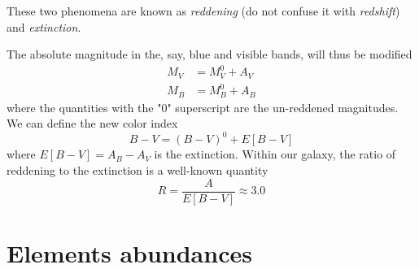 \par These two phenomena are known as \emph{reddening} (do not confuse it with \emph{redshift}) and \emph{extinction}.
\par The absolute magnitude in the, say, blue and visible bands, will thus be modified
\begin{align*}
    M_{V} &= M_{V}^{0}+A_{V}\\
    M_{B} &= M_{B}^{0}+A_{B}
\end{align*} 
where the quantities with the "0" superscript are the un-reddened magnitudes. We can define the new color index
\begin{equation*}
    B-V = (B-V)^{0}+E[B-V]
\end{equation*}
where $E[B-V] = A_{B}-A_{V}$ is the extinction. Within our galaxy, the ratio of reddening to the extinction is a well-known quantity
\begin{equation*}
    R = \frac{A}{E[B-V]} \approx 3.0
\end{equation*}

\section{Elements abundances}

